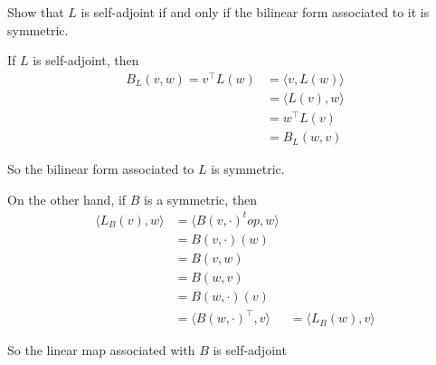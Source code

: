 \documentclass{ximera}
\begin{document}
Show that $L$ is self-adjoint if and only if the bilinear form associated to it is symmetric.
\begin{free-response}
  If $L$ is self-adjoint, then 
  \begin{align*}
    B_L(v,w) = v^\top L(w) &= \langle v , L(w)\rangle\\
    &= \langle L(v), w \rangle\\
    &= w^\top L(v)\\
    &=B_L(w,v)
  \end{align*}
  
  So the bilinear form associated to $L$ is symmetric. 
  
  On the other hand, if $B$ is a symmetric, then
  \begin{align*}
    \langle L_B(v) , w \rangle &= \langle  B(v,\cdot)^top, w\rangle\\
    &= B(v,\cdot)(w)\\
    &=B(v,w)\\
    &=B(w,v)\\
    &=B(w,\cdot)(v)\\
    &=\langle B(w,\cdot)^\top , v \rangle
    &=\langle L_B(w), v\rangle
  \end{align*}
  
  So the linear map associated with $B$ is self-adjoint
\end{free-response}
\end{document}
